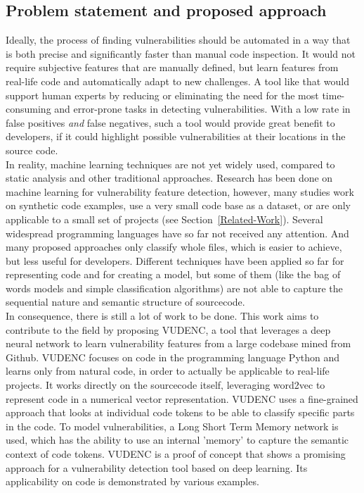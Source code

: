 \documentclass[
a4paper,
pagesize,
pdftex,
12pt,
twoside, %
BCOR=5mm, %
ngerman,
fleqn,
final,
]{scrartcl}
\begin{document}
	\subsection{Problem statement and proposed approach}
	Ideally, the process of finding vulnerabilities should be automated in a way that is both precise and significantly faster than manual code inspection. It would not require subjective features that are manually defined, but learn features from real-life code and automatically adapt to new challenges. A tool like that would support human experts by reducing or eliminating the need for the most time-consuming and error-prone tasks in detecting vulnerabilities. With a low rate in false positives \textit{and} false negatives, such a tool would provide great benefit to developers, if it could highlight possible vulnerabilities at their locations in the source code.\\	
	In reality, machine learning techniques are not yet widely used, compared to static analysis and other traditional approaches. Research has been done on machine learning for vulnerability feature detection, however, many studies work on synthetic code examples, use a very small code base as a dataset, or are only applicable to a small set of projects (see Section~\ref{Related-Work}). Several widespread programming languages have so far not received any attention. And many proposed approaches only classify whole files, which is easier to achieve, but less useful for developers. Different techniques have been applied so far for representing code and for creating a model, but some of them (like the bag of words models and simple classification algorithms) are not able to capture the sequential nature and semantic structure of sourcecode.\\
	In consequence, there is still a lot of work to be done. This work aims to contribute to the field by proposing VUDENC, a tool that leverages a deep neural network to learn vulnerability features from a large codebase mined from Github. VUDENC focuses on code in the programming language Python and learns only from natural code, in order to actually be applicable to real-life projects. It works directly on the sourcecode itself, leveraging word2vec to represent code in a numerical vector representation. VUDENC uses a fine-grained approach that looks at individual code tokens to be able to classify specific parts in the code. To model vulnerabilities, a Long Short Term Memory network is used, which has the ability to use an internal 'memory' to capture the semantic context of code tokens. VUDENC is a proof of concept that shows a promising approach for a vulnerability detection tool based on deep learning. Its applicability on code is demonstrated by various examples. 
\end{document}
